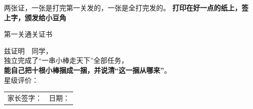 
\begin{unitinfo}
两张证，一张是打完第一关发的，一张是全打完发的。
\textbf{打印在好一点的纸上，签上字，颁发给小豆角}\\
\end{unitinfo}

\begin{center}
\begin{tcolorbox}[enhanced,colback=white,colframe=matc,boxrule=2pt,arc=3mm,
                  width=15.6cm,left=12pt,right=12pt,top=12pt,bottom=12pt]
\begin{center}
{\heiti\Large\color{matc} 第一关通关证书}\\[8pt]
{\kaishu\large
兹证明\ {\Large\underline{\hspace{5cm}}}\ 同学，\\[6pt]
独立完成了“一串小棒走天下”全部任务，\\[4pt]
\textbf{能自己把十根小棒捆成一捆，并说清“这一捆从哪来”}。\\[10pt]
星级评价：\ \starx\ \starx\ \starx\ \starx\ \starx\\[10pt]
\begin{tabular}{@{}p{6cm}p{6cm}@{}}
家长签字：\underline{\hspace{3.2cm}} & 日期：\underline{\hspace{3.2cm}}\\
\end{tabular}}
\end{center}
\end{tcolorbox}
\end{center}

